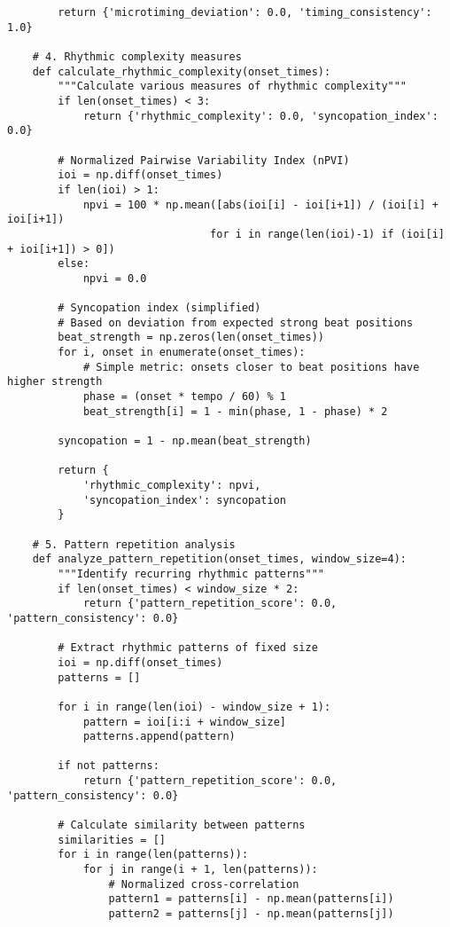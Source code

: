 \documentclass[12pt]{article}
\begin{document}
\begin{verbatim}
        return {'microtiming_deviation': 0.0, 'timing_consistency': 1.0}
    
    # 4. Rhythmic complexity measures
    def calculate_rhythmic_complexity(onset_times):
        """Calculate various measures of rhythmic complexity"""
        if len(onset_times) < 3:
            return {'rhythmic_complexity': 0.0, 'syncopation_index': 0.0}
        
        # Normalized Pairwise Variability Index (nPVI)
        ioi = np.diff(onset_times)
        if len(ioi) > 1:
            npvi = 100 * np.mean([abs(ioi[i] - ioi[i+1]) / (ioi[i] + ioi[i+1]) 
                                for i in range(len(ioi)-1) if (ioi[i] + ioi[i+1]) > 0])
        else:
            npvi = 0.0
        
        # Syncopation index (simplified)
        # Based on deviation from expected strong beat positions
        beat_strength = np.zeros(len(onset_times))
        for i, onset in enumerate(onset_times):
            # Simple metric: onsets closer to beat positions have higher strength
            phase = (onset * tempo / 60) % 1
            beat_strength[i] = 1 - min(phase, 1 - phase) * 2
        
        syncopation = 1 - np.mean(beat_strength)
        
        return {
            'rhythmic_complexity': npvi,
            'syncopation_index': syncopation
        }
    
    # 5. Pattern repetition analysis
    def analyze_pattern_repetition(onset_times, window_size=4):
        """Identify recurring rhythmic patterns"""
        if len(onset_times) < window_size * 2:
            return {'pattern_repetition_score': 0.0, 'pattern_consistency': 0.0}
        
        # Extract rhythmic patterns of fixed size
        ioi = np.diff(onset_times)
        patterns = []
        
        for i in range(len(ioi) - window_size + 1):
            pattern = ioi[i:i + window_size]
            patterns.append(pattern)
        
        if not patterns:
            return {'pattern_repetition_score': 0.0, 'pattern_consistency': 0.0}
        
        # Calculate similarity between patterns
        similarities = []
        for i in range(len(patterns)):
            for j in range(i + 1, len(patterns)):
                # Normalized cross-correlation
                pattern1 = patterns[i] - np.mean(patterns[i])
                pattern2 = patterns[j] - np.mean(patterns[j])
                

\end{verbatim}
\end{document}
